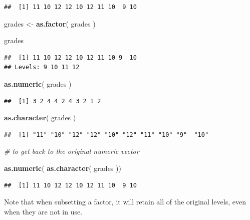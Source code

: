 \documentclass[]{book}
\newenvironment{Shaded}{\begin{snugshade}}{\end{snugshade}}
\newcommand{\CommentTok}[1]{\textcolor[rgb]{0.56,0.35,0.01}{\textit{#1}}}
\newcommand{\KeywordTok}[1]{\textcolor[rgb]{0.13,0.29,0.53}{\textbf{#1}}}
\newcommand{\NormalTok}[1]{#1}
\newcommand{\StringTok}[1]{\textcolor[rgb]{0.31,0.60,0.02}{#1}}
\theoremstyle{definition}
\theoremstyle{definition}
\theoremstyle{definition}
\theoremstyle{remark}
\begin{document}
\begin{verbatim}
##  [1] 11 10 12 12 10 12 11 10  9 10
\end{verbatim}

\begin{Shaded}
\begin{Highlighting}[]
\NormalTok{grades <-}\StringTok{ }\KeywordTok{as.factor}\NormalTok{( grades )}

\NormalTok{grades}
\end{Highlighting}
\end{Shaded}

\begin{verbatim}
##  [1] 11 10 12 12 10 12 11 10 9  10
## Levels: 9 10 11 12
\end{verbatim}

\begin{Shaded}
\begin{Highlighting}[]
\KeywordTok{as.numeric}\NormalTok{( grades )}
\end{Highlighting}
\end{Shaded}

\begin{verbatim}
##  [1] 3 2 4 4 2 4 3 2 1 2
\end{verbatim}

\begin{Shaded}
\begin{Highlighting}[]
\KeywordTok{as.character}\NormalTok{( grades )}
\end{Highlighting}
\end{Shaded}

\begin{verbatim}
##  [1] "11" "10" "12" "12" "10" "12" "11" "10" "9"  "10"
\end{verbatim}

\begin{Shaded}
\begin{Highlighting}[]
\CommentTok{# to get back to the original numeric vector}

\KeywordTok{as.numeric}\NormalTok{( }\KeywordTok{as.character}\NormalTok{( grades ))}
\end{Highlighting}
\end{Shaded}

\begin{verbatim}
##  [1] 11 10 12 12 10 12 11 10  9 10
\end{verbatim}

Note that when subsetting a factor, it will retain all of the original
levels, even when they are not in use.
\end{document}
